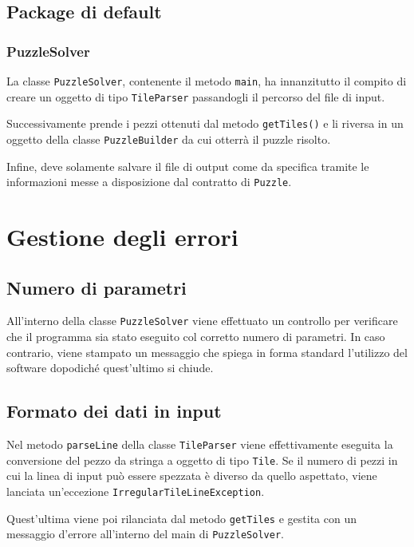 \documentclass[a4paper, 12pt]{article}
\begin{document}
    \subsection{Package di default}

      \subsubsection{PuzzleSolver}

        La classe \verb|PuzzleSolver|, contenente il metodo \verb|main|, ha innanzitutto il compito di creare un oggetto di tipo \verb|TileParser| passandogli il percorso del file di input. 

        Successivamente prende i pezzi ottenuti dal metodo \verb|getTiles()| e li riversa in un oggetto della classe \verb|PuzzleBuilder| da cui otterrà il puzzle risolto.

        Infine, deve solamente salvare il file di output come da specifica tramite le informazioni messe a disposizione dal contratto di \verb|Puzzle|.

  \section{Gestione degli errori}

    \subsection{Numero di parametri}

      All'interno della classe \verb|PuzzleSolver| viene effettuato un controllo per verificare che il programma sia stato eseguito col corretto numero di parametri. In caso contrario, viene stampato un messaggio che spiega in forma standard l'utilizzo del software dopodiché quest'ultimo si chiude.

    \subsection{Formato dei dati in input}

      Nel metodo \verb|parseLine| della classe \verb|TileParser| viene effettivamente eseguita la conversione del pezzo da stringa a oggetto di tipo \verb|Tile|. Se il numero di pezzi in cui la linea di input può essere spezzata è diverso da quello aspettato, viene lanciata un'eccezione \verb|IrregularTileLineException|. 

      Quest'ultima viene poi rilanciata dal metodo \verb|getTiles| e gestita con un messaggio d'errore all'interno del main di \verb|PuzzleSolver|.
\end{document}
